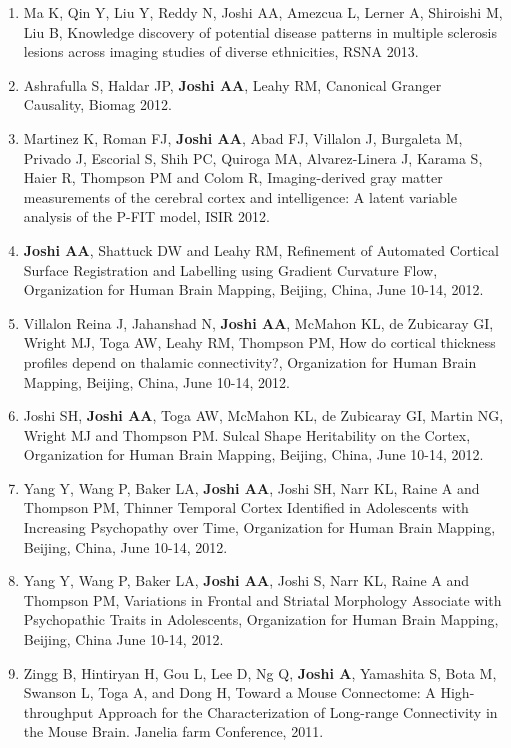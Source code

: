 \documentclass[overlapped,line,letterpaper]{res}
\begin{document}
\begin{resume}
\begin{enumerate}
    \item Ma K, Qin Y, Liu Y, Reddy N, {Joshi AA}, Amezcua L, Lerner A, Shiroishi M, Liu B, {Knowledge discovery of potential disease patterns in multiple sclerosis lesions across imaging studies of diverse ethnicities}, RSNA 2013.

    \item Ashrafulla S, Haldar JP, \textbf{Joshi AA}, Leahy RM, {Canonical Granger Causality}, Biomag 2012.

    \item Martinez K, Roman FJ, \textbf{Joshi AA}, Abad FJ, Villalon J, Burgaleta M, Privado J, Escorial S, Shih PC, Quiroga MA, Alvarez-Linera J, Karama S, Haier R, Thompson PM and Colom R, {Imaging-derived gray matter measurements of the cerebral cortex and intelligence: A latent variable analysis of the P-FIT model}, ISIR 2012.

    \item \textbf{Joshi AA}, Shattuck DW and Leahy RM, {Refinement of Automated Cortical Surface Registration and Labelling using Gradient Curvature Flow}, Organization for Human Brain Mapping, Beijing, China, June 10-14, 2012.

    \item Villalon Reina J, Jahanshad N, \textbf{Joshi AA}, McMahon KL, de Zubicaray GI, Wright MJ, Toga AW, Leahy RM, Thompson PM, {How do cortical thickness profiles depend on thalamic connectivity?}, Organization for Human Brain Mapping, Beijing, China, June 10-14, 2012.

    \item Joshi SH, \textbf{Joshi AA}, Toga AW, McMahon KL, de Zubicaray GI, Martin NG, Wright MJ and Thompson PM. {Sulcal Shape Heritability on the Cortex}, Organization for Human Brain Mapping, Beijing, China, June 10-14, 2012.

    \item Yang Y, Wang P, Baker LA, \textbf{Joshi AA}, Joshi SH, Narr KL, Raine A and Thompson PM, {Thinner Temporal Cortex Identified in Adolescents with Increasing Psychopathy over Time}, Organization for Human Brain Mapping, Beijing, China, June 10-14, 2012.

    \item Yang Y, Wang P, Baker LA, \textbf{Joshi AA}, Joshi S, Narr KL, Raine A and Thompson PM, {Variations in Frontal and Striatal Morphology Associate with Psychopathic Traits in Adolescents}, Organization for Human Brain Mapping, Beijing, China June 10-14, 2012.

    \item Zingg B, Hintiryan H, Gou L, Lee D, Ng Q, \textbf{Joshi A}, Yamashita S, Bota M, Swanson L, Toga A, and Dong H, {Toward a Mouse Connectome: A High-throughput Approach for the Characterization of Long-range Connectivity in the Mouse Brain}. Janelia farm Conference, 2011.


\end{enumerate}
\end{resume}
\end{document}
